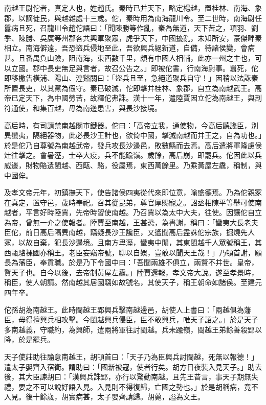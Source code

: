 
\begin{pinyinscope}
南越王尉佗者，真定人也，姓趙氏。秦時已并天下，略定楊越，置桂林、南海、象郡，以謫徙民，與越雜處十三歲。佗，秦時用為南海龍川令。至二世時，南海尉任囂病且死，召龍川令趙佗語曰：「聞陳勝等作亂，秦為無道，天下苦之，項羽、劉季、陳勝、吳廣等州郡各共興軍聚眾，虎爭天下，中國擾亂，未知所安，豪傑畔秦相立。南海僻遠，吾恐盜兵侵地至此，吾欲興兵絕新道，自備，待諸侯變，會病甚。且番禺負山險，阻南海，東西數千里，頗有中國人相輔，此亦一州之主也，可以立國。郡中長吏無足與言者，故召公告之。」即被佗書，行南海尉事。囂死，佗即移檄告橫浦、陽山、湟谿關曰：「盜兵且至，急絕道聚兵自守！」因稍以法誅秦所置長吏，以其黨為假守。秦已破滅，佗即擊并桂林、象郡，自立為南越武王。高帝已定天下，為中國勞苦，故釋佗弗誅。漢十一年，遣陸賈因立佗為南越王，與剖符通使，和集百越，毋為南邊患害，與長沙接境。

高后時，有司請禁南越關市鐵器。佗曰：「高帝立我，通使物，今高后聽讒臣，別異蠻夷，隔絕器物，此必長沙王計也，欲倚中國，擊滅南越而并王之，自為功也。」於是佗乃自尊號為南越武帝，發兵攻長沙邊邑，敗數縣而去焉。高后遣將軍隆慮侯灶往擊之。會暑溼，士卒大疫，兵不能踰嶺。歲餘，高后崩，即罷兵。佗因此以兵威邊，財物賂遺閩越、西甌、駱，役屬焉，東西萬餘里。乃乘黃屋左纛，稱制，與中國侔。

及孝文帝元年，初鎮撫天下，使告諸侯四夷從代來即位意，喻盛德焉。乃為佗親冢在真定，置守邑，歲時奉祀。召其從昆弟，尊官厚賜寵之。詔丞相陳平等舉可使南越者，平言好畤陸賈，先帝時習使南越。乃召賈以為太中大夫，往使。因讓佗自立為帝，曾無一介之使報者。陸賈至南越，王甚恐，為書謝，稱曰：「蠻夷大長老夫臣佗，前日高后隔異南越，竊疑長沙王讒臣，又遙聞高后盡誅佗宗族，掘燒先人冢，以故自棄，犯長沙邊境。且南方卑溼，蠻夷中閒，其東閩越千人眾號稱王，其西甌駱裸國亦稱王。老臣妄竊帝號，聊以自娛，豈敢以聞天王哉！」乃頓首謝，願長為藩臣，奉貢職。於是乃下令國中曰：「吾聞兩雄不俱立，兩賢不并世。皇帝，賢天子也。自今以後，去帝制黃屋左纛。」陸賈還報，孝文帝大說。遂至孝景時，稱臣，使人朝請。然南越其居國竊如故號名，其使天子，稱王朝命如諸侯。至建元四年卒。

佗孫胡為南越王。此時閩越王郢興兵擊南越邊邑，胡使人上書曰：「兩越俱為藩臣，毋得擅興兵相攻擊。今閩越興兵侵臣，臣不敢興兵，唯天子詔之。」於是天子多南越義，守職約，為興師，遣兩將軍往討閩越。兵未踰嶺，閩越王弟餘善殺郢以降，於是罷兵。

天子使莊助往諭意南越王，胡頓首曰：「天子乃為臣興兵討閩越，死無以報德！」遣太子嬰齊入宿衛。謂助曰：「國新被寇，使者行矣。胡方日夜裝入見天子。」助去後，其大臣諫胡曰：「漢興兵誅郢，亦行以驚動南越。且先王昔言，事天子期無失禮，要之不可以說好語入見。入見則不得復歸，亡國之勢也。」於是胡稱病，竟不入見。後十餘歲，胡實病甚，太子嬰齊請歸。胡薨，謚為文王。


\end{pinyinscope}
